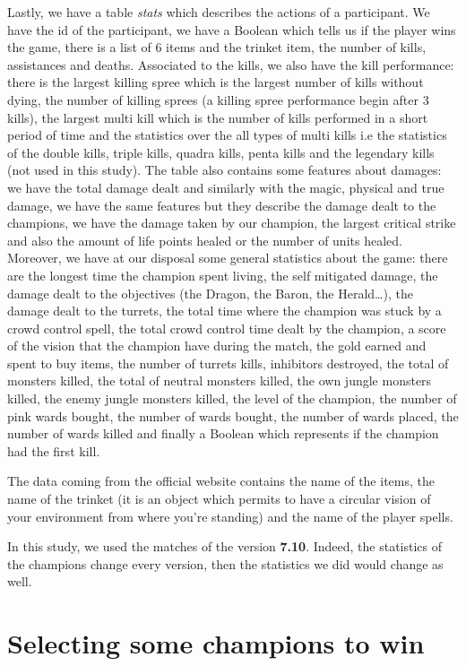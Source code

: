 \documentclass{article}
\def\version{\textbf{7.10}}
\begin{document}
Lastly, we have a table \emph{stats} which describes the actions of a participant. We have the id of the participant, we have a Boolean which tells us if the player wins the game, there is a list of 6 items and the trinket item, the number of kills, assistances and deaths. Associated to the kills, we also have the kill performance: there is the largest killing spree which is the largest number of kills without dying, the number of killing sprees (a killing spree performance begin after 3 kills), the largest multi kill which is the number of kills performed in a short period of time and the statistics over the all types of multi kills i.e the statistics of the double kills, triple kills, quadra kills, penta kills and the legendary kills (not used in this study). The table also contains some features about damages: we have the total damage dealt and similarly with the magic, physical and true damage, we have the same features but they describe the damage dealt to the champions, we have the damage taken by our champion, the largest critical strike and also the amount of life points healed or the number of units healed. 
Moreover, we have at our disposal some general statistics about the game: there are the longest time the champion spent living, the self mitigated damage, the damage dealt to the objectives (the Dragon, the Baron, the Herald\ldots), the damage dealt to the turrets, the total time where the champion was stuck by a crowd control spell, the total crowd control time dealt by the champion, a score of the vision that the champion have during the match, the gold earned and spent to buy items, the number of turrets kills, inhibitors destroyed, the total of monsters killed, the total of neutral monsters killed, the own jungle monsters killed, the enemy jungle monsters killed, the level of the champion, the number of pink wards bought, the number of wards bought, the number of wards placed, the number of wards killed and finally a Boolean which represents if the champion had the first kill.

The data coming from the official website contains the name of the items, the name of the trinket (it is an object which permits to have a circular vision of your environment from where you're standing) and the name of the player spells.

In this study, we used the matches of the version \version. Indeed, the statistics of the champions change every version, then the statistics we did would change as well.

\section{Selecting some champions to win}
\end{document}
